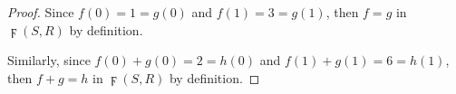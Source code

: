 \begin{Exercise}
	\begin{proof}
		Since $f(0) = 1 = g(0)$ and $f(1) = 3 = g(1)$, then $f = g$ in $\digamma(S,R)$ by definition.
		
		Similarly, since $f(0)+g(0) = 2 = h(0)$ and $f(1)+g(1) = 6 = h(1)$, then $f+g = h$ in $\digamma(S,R)$ by definition.
	\end{proof}
\end{Exercise}